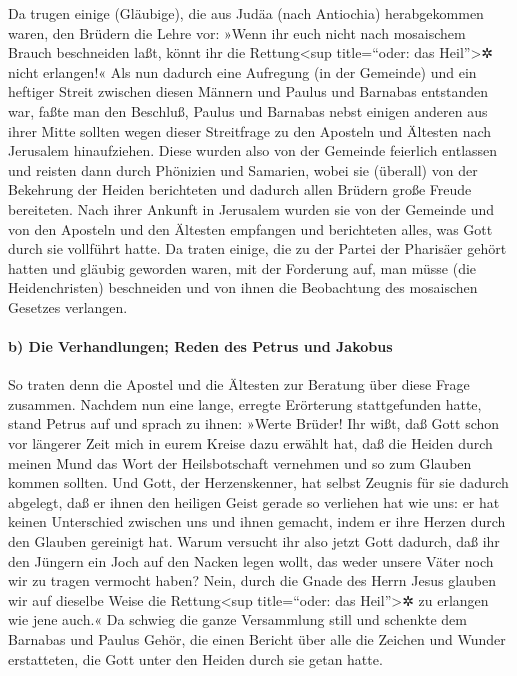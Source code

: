  Da trugen einige (Gläubige), die aus Judäa (nach
Antiochia) herabgekommen waren, den Brüdern die Lehre vor: »Wenn ihr
euch nicht nach mosaischem Brauch beschneiden laßt, könnt ihr die
Rettung\textless sup title=``oder: das Heil''\textgreater✲ nicht
erlangen!«  Als nun dadurch eine Aufregung (in der
Gemeinde) und ein heftiger Streit zwischen diesen Männern und Paulus und
Barnabas entstanden war, faßte man den Beschluß, Paulus und Barnabas
nebst einigen anderen aus ihrer Mitte sollten wegen dieser Streitfrage
zu den Aposteln und Ältesten nach Jerusalem hinaufziehen. 
Diese wurden also von der Gemeinde feierlich entlassen und reisten dann
durch Phönizien und Samarien, wobei sie (überall) von der Bekehrung der
Heiden berichteten und dadurch allen Brüdern große Freude bereiteten.
 Nach ihrer Ankunft in Jerusalem wurden sie von der
Gemeinde und von den Aposteln und den Ältesten empfangen und berichteten
alles, was Gott durch sie vollführt hatte.  Da traten
einige, die zu der Partei der Pharisäer gehört hatten und gläubig
geworden waren, mit der Forderung auf, man müsse (die Heidenchristen)
beschneiden und von ihnen die Beobachtung des mosaischen Gesetzes
verlangen.

\hypertarget{b-die-verhandlungen-reden-des-petrus-und-jakobus}{%
\paragraph{b) Die Verhandlungen; Reden des Petrus und
Jakobus}\label{b-die-verhandlungen-reden-des-petrus-und-jakobus}}

 So traten denn die Apostel und die Ältesten zur Beratung
über diese Frage zusammen.  Nachdem nun eine lange,
erregte Erörterung stattgefunden hatte, stand Petrus auf und sprach zu
ihnen: »Werte Brüder! Ihr wißt, daß Gott schon vor längerer Zeit mich in
eurem Kreise dazu erwählt hat, daß die Heiden durch meinen Mund das Wort
der Heilsbotschaft vernehmen und so zum Glauben kommen sollten.
 Und Gott, der Herzenskenner, hat selbst Zeugnis für sie
dadurch abgelegt, daß er ihnen den heiligen Geist gerade so verliehen
hat wie uns:  er hat keinen Unterschied zwischen uns und
ihnen gemacht, indem er ihre Herzen durch den Glauben gereinigt hat.
 Warum versucht ihr also jetzt Gott dadurch, daß ihr den
Jüngern ein Joch auf den Nacken legen wollt, das weder unsere Väter noch
wir zu tragen vermocht haben?  Nein, durch die Gnade des
Herrn Jesus glauben wir auf dieselbe Weise die Rettung\textless sup
title=``oder: das Heil''\textgreater✲ zu erlangen wie jene auch.«
 Da schwieg die ganze Versammlung still und schenkte dem
Barnabas und Paulus Gehör, die einen Bericht über alle die Zeichen und
Wunder erstatteten, die Gott unter den Heiden durch sie getan hatte.

